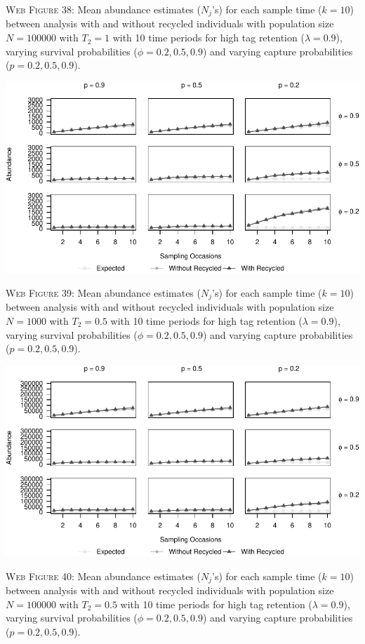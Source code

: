 \documentclass[]{article}
\begin{document}
\textsc{Web Figure 38:} Mean abundance estimates (\(N_j\)'s) for each
sample time (\(k=10\)) between analysis with and without recycled
individuals with population size \(N=100000\) with \(T_2=1\) with 10
time periods for high tag retention (\(\lambda=0.9\)), varying survival
probabilities (\(\phi=0.2,0.5,0.9\)) and varying capture probabilities
(\(p=0.2,0.5,0.9\)).

\newpage

\includegraphics{Appendix_BW_files/figure-latex/39_abundance_H_GJSTL4-1.pdf}

\textsc{Web Figure 39:} Mean abundance estimates (\(N_j\)'s) for each
sample time (\(k=10\)) between analysis with and without recycled
individuals with population size \(N=1000\) with \(T_2=0.5\) with 10
time periods for high tag retention (\(\lambda=0.9\)), varying survival
probabilities (\(\phi=0.2,0.5,0.9\)) and varying capture probabilities
(\(p=0.2,0.5,0.9\)).

\includegraphics{Appendix_BW_files/figure-latex/40_abundance_H_GJSTL3-1.pdf}

\textsc{Web Figure 40:} Mean abundance estimates (\(N_j\)'s) for each
sample time (\(k=10\)) between analysis with and without recycled
individuals with population size \(N=100000\) with \(T_2=0.5\) with 10
time periods for high tag retention (\(\lambda=0.9\)), varying survival
probabilities (\(\phi=0.2,0.5,0.9\)) and varying capture probabilities
(\(p=0.2,0.5,0.9\)).
\end{document}
